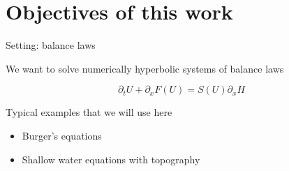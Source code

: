 \documentclass[aspectratio=169]{beamer}
\begin{document}
\begin{frame}[plain]


    
\end{frame}

\section[Intro]{Objectives of this work}
\begin{frame}[t]{Setting: balance laws}
	
	\vspace{0.5cm}
	
	We want to solve numerically  hyperbolic systems of balance laws
	
	\begin{equation}
		\partial_tU+ \partial_x F(U)=  S(U)\partial_xH \nonumber
	\end{equation}
	
	\vspace{1.cm}
	
	Typical examples  that we will use here
	
	
	\begin{itemize}
		\item Burger's equations 
		\vspace{0.2cm}
		\item Shallow water equations with topography
	\end{itemize}
	
%	
\end{frame}
\end{document}

